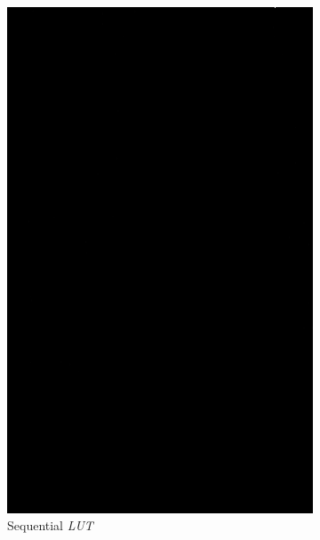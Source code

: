 \begin{figure}
    \begin{subfigure}{0.29\textwidth}
        \includegraphics[width=\linewidth] {../../packages/js-benchmarks/img/diff_seq_seq_lookup.png}
        \caption{Sequential \textit{LUT}}\label{fig:diff:seq_lut}
    \end{subfigure}\hfill
    \begin{subfigure}{0.29\textwidth}

\end{subfigure}
\end{figure}
